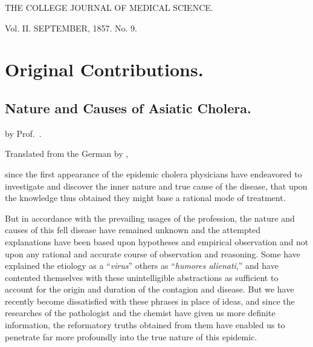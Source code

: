 THE
COLLEGE JOURNAL
OF MEDICAL SCIENCE.

Vol. II.
SEPTEMBER, 1857.
No. 9.

\chapter*{Original Contributions.}

\section*{Nature and Causes of Asiatic Cholera.}

by Prof.\ .

Translated from the German by , \md

 since the first appearance of the epidemic cholera physicians
have endeavored to investigate and discover the inner nature and true
cause of the disease, that upon the knowledge thus obtained they might
base a rational mode of treatment.

But in accordance with the prevailing usages of the profession, the
nature and causes of this fell disease have remained unknown and the
attempted explanations have been based upon hypotheses and empirical
observation and not upon any rational and accurate course of
observation and reasoning. Some have explained the etiology as
a ``\textit{virus}'' others as ``\textit{humores alienati},'' and have contented themselves
with these unintelligible abstractions as sufficient to account for
the origin and duration of the contagion and disease. But we have
recently become dissatisfied with these phrases in place of ideas, and
since the researches of the pathologist and the chemist have given us
more definite information, the reformatory truths obtained from them
have enabled us to penetrate far more profoundly into the true nature
of this epidemic.

\endinput